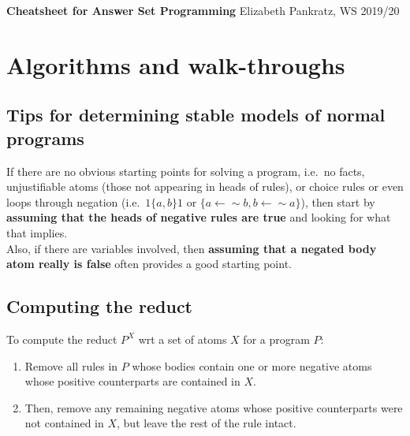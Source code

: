 \documentclass[9pt,a4paper,landscape]{article}
\begin{document}
	
	
{\small
	
\textbf{Cheatsheet for Answer Set Programming} \hfill Elizabeth Pankratz, WS 2019/20
	
\section{Algorithms and walk-throughs}

\vspace{\baselineskip}


\subsection{Tips for determining stable models of normal programs}

If there are no obvious starting points for solving a program, i.e.\ no facts, unjustifiable atoms (those not appearing in heads of rules), or choice rules or even loops through negation (i.e.\ $1\{a, b\}1$ or $\{a \leftarrow {\sim} b, b \leftarrow {\sim} a\}$), then start by \textbf{assuming that the heads of negative rules are true} and looking for what that implies.\\

Also, if there are variables involved, then \textbf{assuming that a negated body atom really is false} often provides a good starting point.

\vspace{\baselineskip}


\subsection{Computing the reduct}
\label{subsec:reduct}

To compute the reduct $P^X$ wrt a set of atoms $X$ for a program $P$:

\begin{enumerate}[noitemsep]
	\item Remove all rules in $P$ whose bodies contain one or more negative atoms whose positive counterparts are contained in $X$.
	\item Then, remove any remaining negative atoms whose positive counterparts were not contained in $X$, but leave the rest of the rule intact.
\end{enumerate}

}
\end{document}
